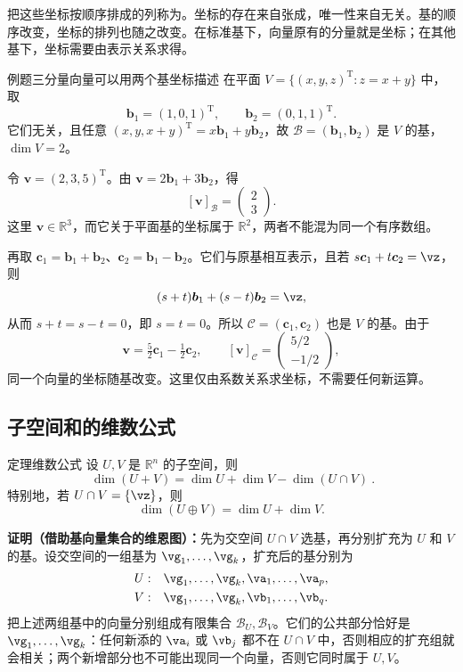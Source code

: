 \documentclass[a4paper,12pt,twoside,openany,fontset=none]{ctexbook}
\newcounter{theorem}[chapter]
\newenvironment{theorem}[1][]{\begin{thmBox}{定理}{#1}}{\end{thmBox}}
\newcounter{example}[chapter]
\newenvironment{example}[1][]{\begin{exBox}{例题}{#1}}{\end{exBox}}
\numberwithin{equation}{chapter}
\begin{document}
把这些坐标按顺序排成的列称为。坐标的存在来自张成，唯一性来自无关。基的顺序改变，坐标的排列也随之改变。在标准基下，向量原有的分量就是坐标；在其他基下，坐标需要由表示关系求得。

\begin{example}[三分量向量可以用两个基坐标描述]
在平面 $V=\{(x,y,z)^{\mathrm T}:z=x+y\}$ 中，取
\[
    \boldsymbol{b}_1=(1,0,1)^{\mathrm T},\qquad \boldsymbol{b}_2=(0,1,1)^{\mathrm T}.
\]
它们无关，且任意 $(x,y,x+y)^{\mathrm T}=x\boldsymbol{b}_1+y\boldsymbol{b}_2$，故 $\mathcal{B}=(\boldsymbol{b}_1,\boldsymbol{b}_2)$ 是 $V$ 的基，$\dim V=2$。

令 $\boldsymbol{v}=(2,3,5)^{\mathrm T}$。由 $\boldsymbol{v}=2\boldsymbol{b}_1+3\boldsymbol{b}_2$，得
\[
    [\boldsymbol{v}]_{\mathcal{B}}=\left(\begin{array}{c}2\\3\end{array}\right).
\]
这里 $\boldsymbol{v}\in\mathbb{R}^3$，而它关于平面基的坐标属于 $\mathbb{R}^2$，两者不能混为同一个有序数组。
\end{example}

再取 $\boldsymbol{c}_1=\boldsymbol{b}_1+\boldsymbol{b}_2$、$\boldsymbol{c}_2=\boldsymbol{b}_1-\boldsymbol{b}_2$。它们与原基相互表示，且若 $s\boldsymbol{c}_1+t\boldsymbol{c}_2=\vz$，则
\[
    (s+t)\boldsymbol{b}_1+(s-t)\boldsymbol{b}_2=\vz,
\]
从而 $s+t=s-t=0$，即 $s=t=0$。所以 $\mathcal{C}=(\boldsymbol{c}_1,\boldsymbol{c}_2)$ 也是 $V$ 的基。由于
\[
    \boldsymbol{v}=\tfrac52\boldsymbol{c}_1-\tfrac12\boldsymbol{c}_2,
    \qquad [\boldsymbol{v}]_{\mathcal{C}}
    =\left(\begin{array}{r}5/2\\-1/2\end{array}\right),
\]
同一个向量的坐标随基改变。这里仅由系数关系求坐标，不需要任何新运算。

\subsection*{子空间和的维数公式}

\begin{theorem}[维数公式]
设 $U,V$ 是 $\mathbb{R}^n$ 的子空间，则
\[
    \boxed{\ \dim(U+V)=\dim U+\dim V-\dim(U\cap V)\ }.
\]
特别地，若 $U\cap V=\{\vz\}$，则
\[
    \dim(U\oplus V)=\dim U+\dim V.
\]
\end{theorem}

\textbf{证明（借助基向量集合的维恩图）：}先为交空间 $U\cap V$ 选基，再分别扩充为 $U$ 和 $V$ 的基。设交空间的一组基为 $\vg_1,\ldots,\vg_k$，扩充后的基分别为
\[
\begin{aligned}
    U:&\quad \vg_1,\ldots,\vg_k,\va_1,\ldots,\va_p,\\
    V:&\quad \vg_1,\ldots,\vg_k,\vb_1,\ldots,\vb_q.
\end{aligned}
\]
把上述两组基中的向量分别组成有限集合 $\mathcal{B}_U,\mathcal{B}_V$。它们的公共部分恰好是 $\vg_1,\ldots,\vg_k$：任何新添的 $\va_i$ 或 $\vb_j$ 都不在 $U\cap V$ 中，否则相应的扩充组就会相关；两个新增部分也不可能出现同一个向量，否则它同时属于 $U,V$。
\end{document}

